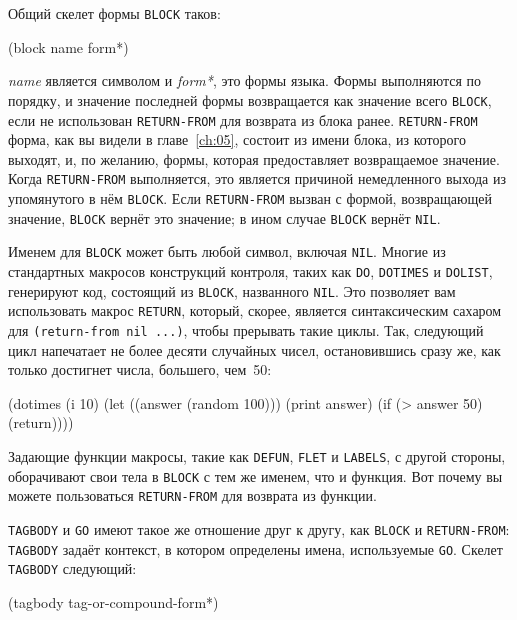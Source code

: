 Общий скелет формы \lstinline{BLOCK} таков:

\begin{myverb}
(block name
  form*)
\end{myverb}

\noindent{}\textit{name} является символом и \textit{form*}, это формы языка. Формы выполняются по
порядку, и значение последней формы возвращается как значение всего \lstinline{BLOCK}, если не
использован \lstinline{RETURN-FROM} для возврата из блока ранее. \lstinline{RETURN-FROM} форма, как
вы видели в главе~\ref{ch:05}, состоит из имени блока, из которого выходят, и, по желанию, формы,
которая предоставляет возвращаемое значение.  Когда \lstinline{RETURN-FROM} выполняется, это
является причиной немедленного выхода из упомянутого в нём \lstinline{BLOCK}.  Если
\lstinline{RETURN-FROM} вызван с формой, возвращающей значение, \lstinline{BLOCK} вернёт это
значение; в ином случае \lstinline{BLOCK} вернёт \lstinline{NIL}.

Именем для \lstinline{BLOCK} может быть любой символ, включая \lstinline{NIL}. Многие из стандартных
макросов конструкций контроля, таких как \lstinline{DO}, \lstinline{DOTIMES} и \lstinline{DOLIST},
генерируют код, состоящий из \lstinline{BLOCK}, названного \lstinline{NIL}. Это позволяет вам
использовать макрос \lstinline{RETURN}, который, скорее, является синтаксическим сахаром для
\lstinline!(return-from nil ...)!, чтобы прерывать такие циклы. Так, следующий цикл
напечатает не более десяти случайных чисел, остановившись сразу же, как только достигнет
числа, большего, чем~50:

\begin{myverb}
(dotimes (i 10)
  (let ((answer (random 100)))
    (print answer)
    (if (> answer 50) (return))))
\end{myverb}

Задающие функции макросы, такие как \lstinline{DEFUN}, \lstinline{FLET} и \lstinline{LABELS}, с другой
стороны, оборачивают свои тела в \lstinline{BLOCK} с тем же именем, что и функция. Вот почему
вы можете пользоваться \lstinline{RETURN-FROM} для возврата из функции.

\lstinline{TAGBODY} и \lstinline{GO} имеют такое же отношение друг к другу, как \lstinline{BLOCK} и
\lstinline{RETURN-FROM}: \lstinline{TAGBODY} задаёт контекст, в котором определены имена,
используемые \lstinline{GO}. Скелет \lstinline{TAGBODY} следующий:

\begin{myverb}
(tagbody
  tag-or-compound-form*)
\end{myverb}

